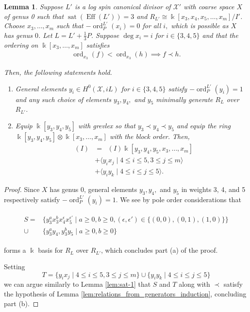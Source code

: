 \documentclass{amsart}
\theoremstyle{plain}
\newtheorem{lem}[thm]{Lemma}
\theoremstyle{definition}
\theoremstyle{remark}
\numberwithin{equation}{section}
\newcommand\Bk{{\Bbbk}}
\DeclareMathOperator{\ord}{ord}
\newcommand\sx{\mathscr X}
\newcommand{\halfcan}{L}
\DeclareMathOperator{\initial}{in_\prec}
\DeclareMathOperator{\Eff}{Eff}
\DeclareMathOperator{\sat}{sat}
\begin{document}
\begin{lem}
\label{lem:sat-3}
Suppose $\halfcan'$ is a log spin canonical divisor of $\sx'$ with coarse
space $X$ of genus 0 such that $\sat(\Eff(\halfcan')) = 3$ and $R_
{\halfcan'} \cong \Bk[x_3, x_4 , x_5, \ldots, x_m]/I'$. Choose $x_3, \ldots, x_m$ such that $-\ord^{L'}_P(x_i)=0$ for all $i,$ which is possible as $X$ has genus $0$. Let $L = L' + \frac
{1}{3}P$. Suppose $\deg x_i = i$ for $i \in \{3, 4, 5\}$ and that
the ordering on $\Bk[x_3, \ldots, x_m]$ satisfies
\begin{align*}
	\ord_{x_3}(f) < \ord_{x_3}(h) \implies f \prec h.
\end{align*}

\noindent
Then, the following statements hold.

\begin{enumerate}
	\item[(a)] General elements  $y_i \in H^0(\sx, iL)$ for $i \in \{3,
		4,5\}$ satisfy $-\ord_P^{\halfcan'}(y_i) = 1$ and any such choice of elements $y
		_3, y_4,$ and $y_5$ minimally generate $R_\halfcan$ over $R_{\halfcan'}$.
	\item[(b)] Equip $\Bk[y_3, y_4, y_5]$ with grevlex so that $y_3 \prec 
		y_4 \prec y_5$
		and equip the ring $\Bk[y_3, y_4, y_5] \otimes \Bk[x_3, \ldots, x_m]$ with the block order.  Then,
		\begin{align*}
			\initial(I) &= \initial(I) \Bk[y_3, y_4, y_5, x_3, \ldots, x_m] \\
			&+ \langle y_i x_j \mid 4 \leq i \leq 5, 3 \leq j \leq m\rangle \\
			&+ \langle y_i y_k \mid 4 \leq i \leq j \leq 5\rangle.
		\end{align*}
\end{enumerate}
\end{lem}

\begin{proof}
Since $X$ has genus 0, general
elements $y_3, y_4,$ and $y_5$ in weights 3, 4, and 5 respectively satisfy $-\ord_P^{\halfcan'}(y_i) =
1$. We see by pole order considerations that

\begin{align}
\label{eqn:add_one_generator}
	\begin{split}
		S=	&\{ y_3^ax_3^b x_4^\epsilon x_5^{\epsilon'} \mid a \geq 0, b 
		\geq 0,(\epsilon, \epsilon') \in \{(0,0),(0,1),(1,0)\} \} \\
		\cup \;&\{y_3^ay_4, y_3^by_5 \mid a \geq 0, b \geq 0 \}
	\end{split}
\end{align}

\noindent forms a $\Bk$ basis for $R_\halfcan$ over $R_{\halfcan'}$, which concludes part (a) of the proof.

Setting
\[
	T = \{ y_i x_j \mid 4 \leq i \leq 5, 3 \leq j \leq m\} \cup \{ y_i y_k \mid 4 \leq i \leq j \leq 5\} 
\]
we can argue similarly to Lemma \ref{lem:sat-1} that $S$ and $T$ along with $\prec$ satisfy the hypothesis of Lemma \ref{lem:relations_from_generators_induction}, concluding part (b).
\end{proof}
\end{document}
